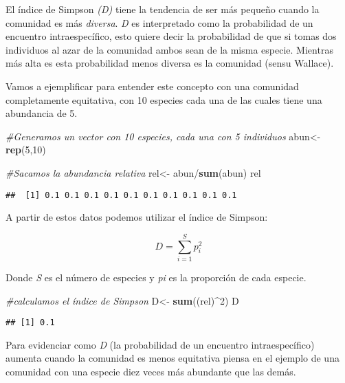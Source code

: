\documentclass[]{book}
\newenvironment{Shaded}{\begin{snugshade}}{\end{snugshade}}
\newcommand{\KeywordTok}[1]{\textcolor[rgb]{0.13,0.29,0.53}{\textbf{{#1}}}}
\newcommand{\DecValTok}[1]{\textcolor[rgb]{0.00,0.00,0.81}{{#1}}}
\newcommand{\StringTok}[1]{\textcolor[rgb]{0.31,0.60,0.02}{{#1}}}
\newcommand{\CommentTok}[1]{\textcolor[rgb]{0.56,0.35,0.01}{\textit{{#1}}}}
\newcommand{\NormalTok}[1]{{#1}}
\begin{document}
El índice de Simpson \emph{(D)} tiene la tendencia de ser más pequeño
cuando la comunidad es más \emph{diversa}. \emph{D} es interpretado como
la probabilidad de un encuentro intraespecífico, esto quiere decir la
probabilidad de que si tomas dos individuos al azar de la comunidad
ambos sean de la misma especie. Mientras más alta es esta probabilidad
menos diversa es la comunidad (sensu Wallace).

Vamos a ejemplificar para entender este concepto con una comunidad
completamente equitativa, con 10 especies cada una de las cuales tiene
una abundancia de 5.

\begin{Shaded}
\begin{Highlighting}[]
\CommentTok{#Generamos un vector con 10 especies, cada una con 5 individuos}
\NormalTok{abun<-}\StringTok{ }\KeywordTok{rep}\NormalTok{(}\DecValTok{5}\NormalTok{,}\DecValTok{10}\NormalTok{)}

\CommentTok{#Sacamos la abundancia relativa}
\NormalTok{rel<-}\StringTok{ }\NormalTok{abun/}\KeywordTok{sum}\NormalTok{(abun)}
\NormalTok{rel}
\end{Highlighting}
\end{Shaded}

\begin{verbatim}
##  [1] 0.1 0.1 0.1 0.1 0.1 0.1 0.1 0.1 0.1 0.1
\end{verbatim}

A partir de estos datos podemos utilizar el índice de Simpson:

\[
D=\sum_{i=1}^S p_i^2
\]

Donde \emph{S} es el número de especies y \emph{pi} es la proporción de
cada especie.

\begin{Shaded}
\begin{Highlighting}[]
\CommentTok{#calculamos el índice de Simpson}
\NormalTok{D<-}\StringTok{ }\KeywordTok{sum}\NormalTok{((rel)^}\DecValTok{2}\NormalTok{)}
\NormalTok{D}
\end{Highlighting}
\end{Shaded}

\begin{verbatim}
## [1] 0.1
\end{verbatim}

Para evidenciar como \emph{D} (la probabilidad de un encuentro
intraespecífico) aumenta cuando la comunidad es menos equitativa piensa
en el ejemplo de una comunidad con una especie diez veces más abundante
que las demás.
\end{document}

